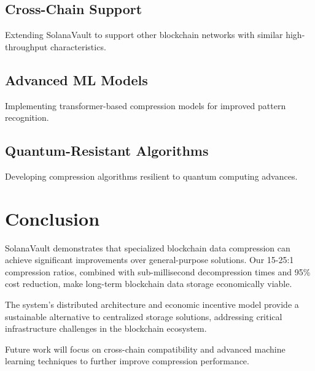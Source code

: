 \documentclass[11pt,a4paper]{article}
\begin{document}
\subsection{Cross-Chain Support}
Extending SolanaVault to support other blockchain networks with similar high-throughput characteristics.

\subsection{Advanced ML Models}
Implementing transformer-based compression models for improved pattern recognition.

\subsection{Quantum-Resistant Algorithms}
Developing compression algorithms resilient to quantum computing advances.

\section{Conclusion}

SolanaVault demonstrates that specialized blockchain data compression can achieve significant improvements over general-purpose solutions. Our 15-25:1 compression ratios, combined with sub-millisecond decompression times and 95\% cost reduction, make long-term blockchain data storage economically viable.

The system's distributed architecture and economic incentive model provide a sustainable alternative to centralized storage solutions, addressing critical infrastructure challenges in the blockchain ecosystem.

Future work will focus on cross-chain compatibility and advanced machine learning techniques to further improve compression performance.



\end{document}
